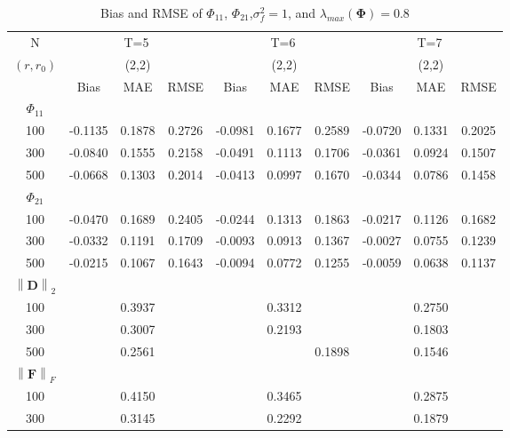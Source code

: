 \documentclass[12pt,a4paper,hyperref]{article}
\begin{document}
\begin{table}[H]
\caption{Bias and RMSE of $\Phi_{11}$, $\Phi_{21}$,$\sigma^{2}_{f}=1$,  and $\lambda_{max}(\boldsymbol{\Phi})=0.8$}
\centering
\tabcolsep=0.11cm
\begin{threeparttable}
\begin{tabular} {*{10}{c}}
\toprule
N& \multicolumn{3}{c}{T=5}&\multicolumn{3}{c}{T=6}&\multicolumn{3}{c}{T=7}\\
\cmidrule(lr){1-10}
$(r,r_{0})$ &   &(2,2)  &  &   &(2,2)  & &  &(2,2) & \\
\cmidrule(lr){1-4} \cmidrule(lr){5-7}\cmidrule(lr){8-10}
& \multicolumn{1}{c}{Bias} &\multicolumn{1}{c}{MAE}& \multicolumn{1}{c}{RMSE}&\multicolumn{1}{c}{Bias} &\multicolumn{1}{c}{MAE}& \multicolumn{1}{c}{RMSE}&\multicolumn{1}{c}{Bias}&\multicolumn{1}{c}{MAE} & \multicolumn{1}{c}{RMSE}\\
  \cmidrule(lr){2-4} \cmidrule(lr){5-7} \cmidrule(lr){8-10}
 $\Phi_{11}$\\
\cmidrule(lr){1-10}
 100&-0.1135 &0.1878 &0.2726 & -0.0981 &0.1677 & 0.2589& -0.0720&0.1331&0.2025 \\
300&-0.0840& 0.1555& 0.2158& -0.0491& 0.1113& 0.1706& -0.0361&0.0924 &0.1507\\
500&-0.0668 & 0.1303& 0.2014&-0.0413  &0.0997 &0.1670 & -0.0344& 0.0786&0.1458 \\
\cmidrule(lr){1-10}
$\Phi_{21}$\\
\cmidrule(lr){1-4}   \cmidrule(lr){5-7}   \cmidrule(lr){8-10}
100& -0.0470& 0.1689&0.2405& -0.0244 & 0.1313& 0.1863& -0.0217&0.1126 &0.1682\\
300&-0.0332 & 0.1191&0.1709 &-0.0093  &0.0913 & 0.1367&-0.0027 & 0.0755&0.1239\\
500&-0.0215& 0.1067&0.1643 & -0.0094 & 0.0772&0.1255 &-0.0059& 0.0638& 0.1137\\
\cmidrule(lr){1-10}
$\left\| \boldsymbol{D} \right\|_{2} $\\
\cmidrule(lr){1-4}   \cmidrule(lr){5-7}   \cmidrule(lr){8-10}
100& &0.3937& &  &0.3312& & & 0.2750& \\
300& & 0.3007& &  &0.2193 & & & 0.1803&\\
500& & 0.2561& &  & &0.1898& &0.1546 & \\
\cmidrule(lr){1-10}
$\left\| \boldsymbol{F} \right\|_{F} $\\
\cmidrule(lr){1-4}   \cmidrule(lr){5-7}   \cmidrule(lr){8-10}
100& &0.4150 & &  & 0.3465& & &0.2875 & \\
300& &0.3145 & &  &0.2292 & & &0.1879 &\\

\end{tabular}
\end{threeparttable}
\end{table}
\end{document}
